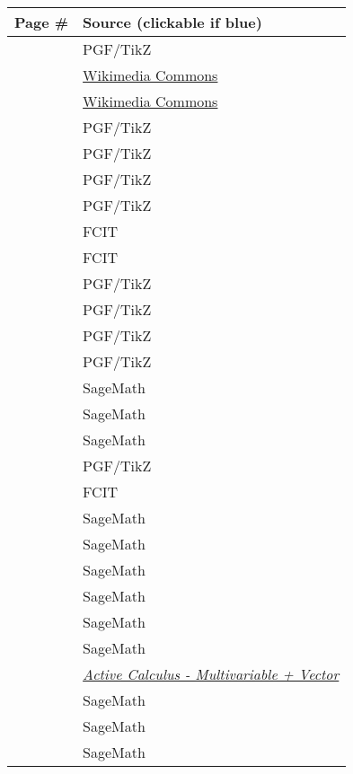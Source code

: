 \medskip 

\begin{tabular}{c|l}
Page \# & Source (clickable if blue)\\ \hline
\pageref{img:multivar-fn-graph} & PGF/TikZ \\ \hline
\pageref{img:right-hand-axes} & \href{https://commons.wikimedia.org/wiki/File:Right_hand_rule_Cartesian_axes-permuted.svg}{Wikimedia Commons}  \\ \hline
\pageref{img:wikimedia-rhr-cross-product} & \href{https://commons.wikimedia.org/wiki/File:Right_hand_rule_cross_product_large_print.svg}{Wikimedia Commons} \\ \hline
\pageref{img:next-3d-graph} & PGF/TikZ \\ \hline
\pageref{img:3d-graph-traces} & PGF/TikZ \\ \hline
\pageref{img:next-3d-graph} & PGF/TikZ \\ \hline
\pageref{img:3d-graph-traces} & PGF/TikZ \\ \hline
\pageref{img:fcit-page-1} & FCIT \\ \hline
\pageref{img:fcit-page-2} & FCIT \\ \hline
\pageref{img:tikz-paraboloid} & PGF/TikZ \\ \hline
\pageref{img:tikz-cone} & PGF/TikZ \\ \hline
\pageref{img:tikz-saddle} & PGF/TikZ \\ \hline
\pageref{img:tikz-bad-limit} & PGF/TikZ \\ \hline
\pageref{img:sage-level-curves} & SageMath \\ \hline
\pageref{img:sage-saddle} & SageMath \\ \hline
\pageref{img:sage-level-curves-again} & SageMath \\ \hline
\pageref{img:tikz-paraboloid-again} & PGF/TikZ \\ \hline 
\pageref{img:fcit-contour-diagram} & FCIT \\ \hline
\pageref{img:sage-parabolas-gradient} & SageMath \\ \hline
\pageref{img:sage-double-int-1} & SageMath \\ \hline
\pageref{img:sage-double-int-2} & SageMath \\ \hline
\pageref{img:sage-double-int-3} & SageMath \\ \hline
\pageref{img:sage-vector-field-1} & SageMath \\ \hline 
\pageref{img:sage-vector-field-2} & SageMath \\ \hline 
\pageref{img:textbook-vector-field} & \href{https://activecalculus.org/vector/S_Vector_IdeaLineIntegral.html#SS_Vector_IdeaLineIntegral_LineIntegrals}{\textit{Active Calculus - Multivariable + Vector}} \\ \hline 
\pageref{img:sage-vector-field-3} & SageMath \\ \hline 
\pageref{img:sage-vector-field-4} & SageMath \\ \hline 
\pageref{img:sage-vector-field-5} & SageMath \\ \hline 
\end{tabular} 

